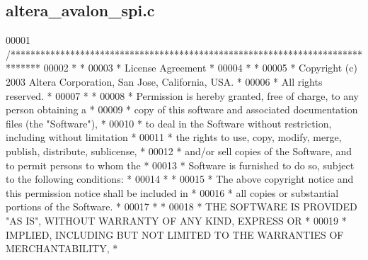 \subsection{altera\+\_\+avalon\+\_\+spi.\+c}
\label{altera__avalon__spi_8c_source}

\begin{DoxyCode}
00001 \textcolor{comment}{/******************************************************************************}
00002 \textcolor{comment}{*                                                                             *}
00003 \textcolor{comment}{* License Agreement                                                           *}
00004 \textcolor{comment}{*                                                                             *}
00005 \textcolor{comment}{* Copyright (c) 2003 Altera Corporation, San Jose, California, USA.           *}
00006 \textcolor{comment}{* All rights reserved.                                                        *}
00007 \textcolor{comment}{*                                                                             *}
00008 \textcolor{comment}{* Permission is hereby granted, free of charge, to any person obtaining a     *}
00009 \textcolor{comment}{* copy of this software and associated documentation files (the "Software"),  *}
00010 \textcolor{comment}{* to deal in the Software without restriction, including without limitation   *}
00011 \textcolor{comment}{* the rights to use, copy, modify, merge, publish, distribute, sublicense,    *}
00012 \textcolor{comment}{* and/or sell copies of the Software, and to permit persons to whom the       *}
00013 \textcolor{comment}{* Software is furnished to do so, subject to the following conditions:        *}
00014 \textcolor{comment}{*                                                                             *}
00015 \textcolor{comment}{* The above copyright notice and this permission notice shall be included in  *}
00016 \textcolor{comment}{* all copies or substantial portions of the Software.                         *}
00017 \textcolor{comment}{*                                                                             *}
00018 \textcolor{comment}{* THE SOFTWARE IS PROVIDED "AS IS", WITHOUT WARRANTY OF ANY KIND, EXPRESS OR  *}
00019 \textcolor{comment}{* IMPLIED, INCLUDING BUT NOT LIMITED TO THE WARRANTIES OF MERCHANTABILITY,    *}

\end{DoxyCode}
